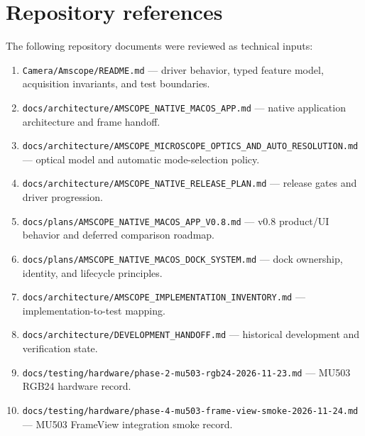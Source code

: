 \documentclass[11pt,a4paper,oneside]{article}
\newcommand{\code}[1]{\texttt{\small #1}}
\begin{document}
\section{Repository references}
\label{sec:references}
The following repository documents were reviewed as technical inputs:
\begin{enumerate}
  \item \code{Camera/Amscope/README.md} --- driver behavior, typed feature model, acquisition invariants, and test boundaries.
  \item \code{docs/architecture/AMSCOPE\_NATIVE\_MACOS\_APP.md} --- native application architecture and frame handoff.
  \item \code{docs/architecture/AMSCOPE\_MICROSCOPE\_OPTICS\_AND\_AUTO\_RESOLUTION.md} --- optical model and automatic mode-selection policy.
  \item \code{docs/architecture/AMSCOPE\_NATIVE\_RELEASE\_PLAN.md} --- release gates and driver progression.
  \item \code{docs/plans/AMSCOPE\_NATIVE\_MACOS\_APP\_V0.8.md} --- v0.8 product/UI behavior and deferred comparison roadmap.
  \item \code{docs/plans/AMSCOPE\_NATIVE\_MACOS\_DOCK\_SYSTEM.md} --- dock ownership, identity, and lifecycle principles.
  \item \code{docs/architecture/AMSCOPE\_IMPLEMENTATION\_INVENTORY.md} --- implementation-to-test mapping.
  \item \code{docs/architecture/DEVELOPMENT\_HANDOFF.md} --- historical development and verification state.
  \item \code{docs/testing/hardware/phase-2-mu503-rgb24-2026-11-23.md} --- MU503 RGB24 hardware record.
  \item \code{docs/testing/hardware/phase-4-mu503-frame-view-smoke-2026-11-24.md} --- MU503 FrameView integration smoke record.
\end{enumerate}
\end{document}
